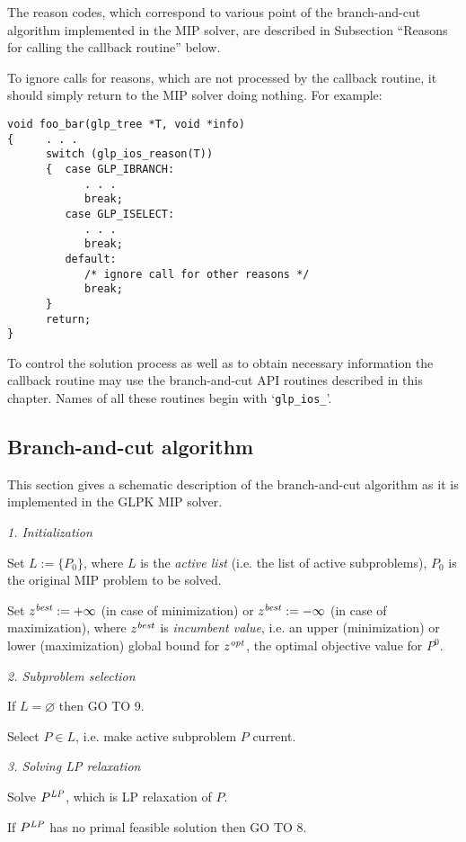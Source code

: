The reason codes, which correspond to various point of the
branch-and-cut algorithm implemented in the MIP solver, are described
in Subsection ``Reasons for calling the callback routine'' below.

To ignore calls for reasons, which are not processed by the callback
routine, it should simply return to the MIP solver doing nothing. For
example:

\begin{verbatim}
void foo_bar(glp_tree *T, void *info)
{     . . .
      switch (glp_ios_reason(T))
      {  case GLP_IBRANCH:
            . . .
            break;
         case GLP_ISELECT:
            . . .
            break;
         default:
            /* ignore call for other reasons */
            break;
      }
      return;
}
\end{verbatim}

To control the solution process as well as to obtain necessary
information the callback routine may use the branch-and-cut API
routines described in this chapter. Names of all these routines begin
with `\verb|glp_ios_|'.

\subsection{Branch-and-cut algorithm}

This section gives a schematic description of the branch-and-cut
algorithm as it is implemented in the GLPK MIP solver.

{\it 1. Initialization}

Set $L:=\{P_0\}$, where $L$ is the {\it active list} (i.e. the list of
active subproblems), $P_0$ is the original MIP problem to be solved.

Set $z^{\it best}:=+\infty$ (in case of minimization) or
$z^{\it best}:=-\infty$ (in case of maximization), where $z^{\it best}$
is {\it incumbent value}, i.e. an upper (minimization) or lower
(maximization) global bound for $z^{\it opt}$, the optimal objective
value for $P^0$.

{\it 2. Subproblem selection}

If $L=\varnothing$ then GO TO 9.

Select $P\in L$, i.e. make active subproblem $P$ current.

\newpage

{\it 3. Solving LP relaxation}

Solve $P^{\it LP}$, which is LP relaxation of $P$.

If $P^{\it LP}$ has no primal feasible solution then GO TO 8.

